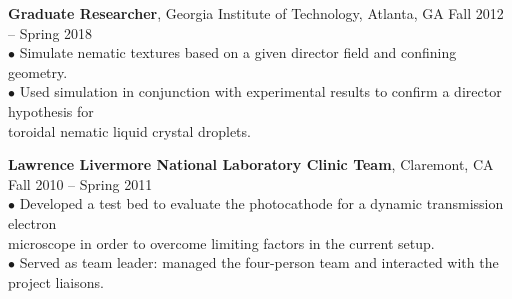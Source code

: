 \documentclass[10pt]{article}
\begin{document}
{\bf Graduate Researcher}, Georgia Institute of Technology, Atlanta, GA \hfill Fall 2012 -- Spring 2018\\
\hspace*{10pt}$\bullet$ Simulate nematic textures based on a given director field and confining geometry.\\
\hspace*{10pt}$\bullet$ Used simulation in conjunction with experimental results to confirm a director hypothesis for \\ \hspace*{15pt} toroidal nematic liquid crystal droplets.\\


\newpage


{\bf Lawrence Livermore National Laboratory Clinic Team}, Claremont, CA \hfill Fall 2010 -- Spring 2011\\
\hspace*{10pt}$\bullet$ Developed a test bed to evaluate the photocathode for a dynamic transmission electron \\ \hspace*{15pt} microscope in order to overcome limiting factors in the current setup.\\
\hspace*{10pt}$\bullet$ Served as team leader: managed the four-person team and interacted with the project liaisons.\\


\end{document}
